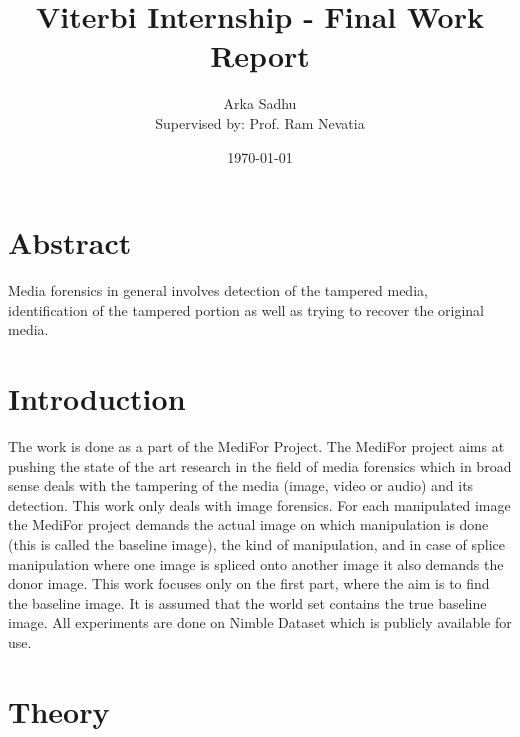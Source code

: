 \documentclass{article}
\title{Viterbi Internship - Final Work Report}
\author{Arka Sadhu\\{ Supervised by: Prof. Ram Nevatia}}
\date{\today}
\begin{document}
\maketitle

\tableofcontents
\newpage

\section{Abstract}
Media forensics in general involves detection of the tampered media, identification of the tampered portion as well as trying to recover the original media.

\section{Introduction}
The work is done as a part of the MediFor Project. The MediFor project aims at pushing the state of the art research in the field of media forensics which in broad sense deals with the tampering of the media (image, video or audio) and its detection. This work only deals with image forensics. For each manipulated image the MediFor project demands the actual image on which manipulation is done (this is called the baseline image), the kind of manipulation, and in case of splice manipulation where one image is spliced onto another image it also demands the donor image. This work focuses only on the first part, where the aim is to find the baseline image. It is assumed that the world set contains the true baseline image. All experiments are done on Nimble Dataset which is publicly available for use.

\section{Theory}
\end{document}
